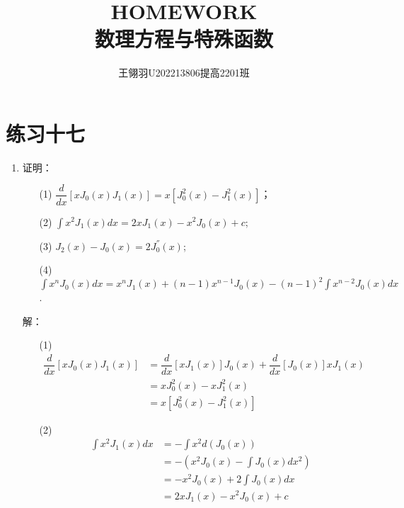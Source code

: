 \documentclass[11pt]{article}
\begin{document}
\title{\vspace{-2cm}HOMEWORK\\ 数理方程与特殊函数}
\author{王翎羽\quad U202213806\quad 提高2201班}
\maketitle

\section*{练习十七}
\begin{enumerate}
    \item 证明：
    \begin{enumerate}
        \item[(1)] $\dfrac{d}{dx}[xJ_{0}(x)J_{1}(x)]=x[J_{0}^2(x)-J_{1}^{2}(x)]$；
        \item[(2)] $\displaystyle\int x^2 J_{1}(x)dx=2xJ_1(x)-x^2 J_{0}(x)+c$;
        \item[(3)] $J_{2}(x)-J_{0}(x)=2J_{0}^{''}(x)$;
        \item[(4)] $\displaystyle\int x^{n}J_{0}(x)dx=x^{n}J_{1}(x)+(n-1)x^{n-1}J_0(x)-(n-1)^2 \displaystyle\int x^{n-2}J_0(x)dx$.
    \end{enumerate}
    解：
    \begin{enumerate}
        \item[(1)]\[\begin{aligned}
                        \dfrac{d}{dx}[xJ_{0}(x)J_{1}(x)]&=\dfrac{d}{dx}[xJ_{1}(x)]J_{0}(x)+\dfrac{d}{dx}[J_{0}(x)]xJ_{1}(x)\\
                                                        &=xJ_{0}^{2}(x)-xJ_{1}^{2}(x)\\
                                                        &=x[J_{0}^2(x)-J_{1}^{2}(x)]
                   \end{aligned}\]
        \item[(2)] \[\begin{aligned}
                        \displaystyle\int x^2 J_{1}(x)dx&=-\displaystyle\int x^2 d(J_{0}(x))\\
                                                        &=-(x^2 J_{0}(x)-\displaystyle\int J_{0}(x)dx^2)\\
                                                        &=-x^2 J_{0}(x)+2\displaystyle\int J_{0}(x)dx\\
                                                        &=2xJ_1(x)-x^2 J_{0}(x)+c
                   \end{aligned}\]

\end{enumerate}
\end{enumerate}
\end{document}

